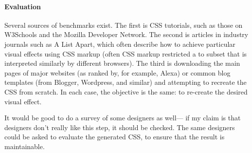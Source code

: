 \documentclass{simple}
\begin{document}
\paragraph{Evaluation}

Several sources of benchmarks exist.
The first is CSS tutorials,
  such as those on W3Schools and the Mozilla Developer Network.
The second is articles in industry journals such as A List Apart,
  which often describe how to achieve particular visual effects
  using CSS markup
  (often CSS markup restricted a to subset
  that is interpreted similarly by different browsers).
The third is downloading the main pages of major websites
  (as ranked by, for example, Alexa)
  or common blog templates (from Blogger, Wordpress, and similar)
  and attempting to recreate the CSS from scratch.
In each case, the objective is the same:
  to re-create the desired visual effect.

It would be good to do a survey of some designers as well---%
  if my claim is that designers don't really like this step,
  it should be checked.
The same designers could be asked to evaluate the generated CSS,
  to ensure that the result is maintainable.
  
%
  



\end{document}
